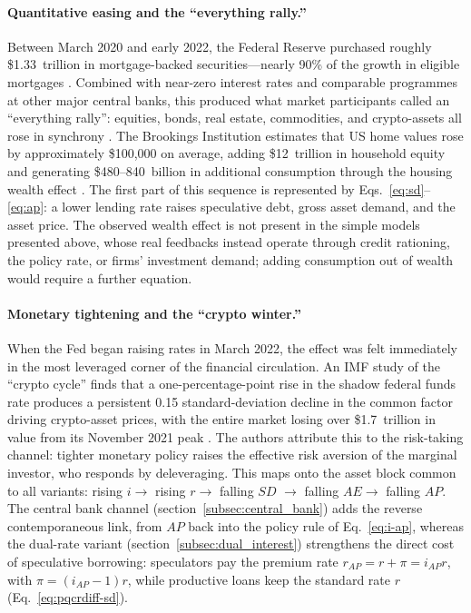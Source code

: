 \documentclass[12pt,a4paper]{article}
\begin{document}
\paragraph{Quantitative easing and the ``everything rally.''}
Between March 2020 and early 2022, the Federal Reserve purchased roughly \$1.33~trillion in mortgage-backed securities---nearly 90\% of the growth in eligible mortgages \citep{kleinQuantitativeEasingHousing2025}. Combined with near-zero interest rates and comparable programmes at other major central banks, this produced what market participants called an ``everything rally'': equities, bonds, real estate, commodities, and crypto-assets all rose in synchrony \citep{wigglesworthEverythingRallyVaccines2020}. The Brookings Institution estimates that US home values rose by approximately \$100,000 on average, adding \$12~trillion in household equity and generating \$480--840~billion in additional consumption through the housing wealth effect \citep{kleinQuantitativeEasingHousing2025}. The first part of this sequence is represented by Eqs.~\ref{eq:sd}--\ref{eq:ap}: a lower lending rate raises speculative debt, gross asset demand, and the asset price. The observed wealth effect is not present in the simple models presented above, whose real feedbacks instead operate through credit rationing, the policy rate, or firms' investment demand; adding consumption out of wealth would require a further equation.

\paragraph{Monetary tightening and the ``crypto winter.''}
When the Fed began raising rates in March 2022, the effect was felt immediately in the most leveraged corner of the financial circulation. An IMF study of the ``crypto cycle'' finds that a one-percentage-point rise in the shadow federal funds rate produces a persistent 0.15 standard-deviation decline in the common factor driving crypto-asset prices, with the entire market losing over \$1.7~trillion in value from its November 2021 peak \citep{cheCryptoCycleUS2023}. The authors attribute this to the risk-taking channel: tighter monetary policy raises the effective risk aversion of the marginal investor, who responds by deleveraging. This maps onto the asset block common to all variants: rising \(i \to\) rising \(r \to\) falling \(SD\) \(\to\) falling \(AE \to\) falling \(AP\). The central bank channel (section~\ref{subsec:central_bank}) adds the reverse contemporaneous link, from \(AP\) back into the policy rule of Eq.~\eqref{eq:i-ap}, whereas the dual-rate variant (section~\ref{subsec:dual_interest}) strengthens the direct cost of speculative borrowing: speculators pay the premium rate \(r_{AP}=r+\pi=i_{AP}r\), with \(\pi=(i_{AP}-1)r\), while productive loans keep the standard rate \(r\) (Eq.~\eqref{eq:pqcrdiff-sd}).
\end{document}
